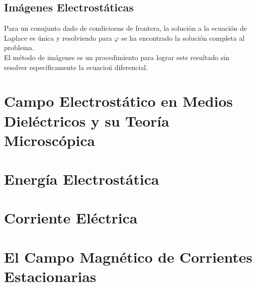 \section{Imágenes Electrostáticas}
Para un conujunto dado de condicioens de frontera, la solución a la ecuación de Laplace es única y resolviendo para $\varphi$ se ha encontrado la solución completa al problema. \\
El método de imágenes es un procedimiento para lograr este resultado sin resolver específicamente la ecuacioń diferencial. 

















\chapter{Campo Electrostático en Medios Dieléctricos y su Teoría Microscópica}










\chapter{Energía Electrostática}







\chapter{Corriente Eléctrica}








\chapter{El Campo Magnético de Corrientes Estacionarias}









